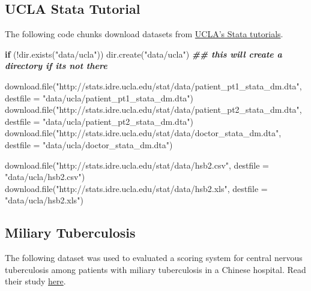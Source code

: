 \documentclass[
]{book}
\newenvironment{Shaded}{\begin{snugshade}}{\end{snugshade}}
\newcommand{\AttributeTok}[1]{\textcolor[rgb]{0.77,0.63,0.00}{#1}}
\newcommand{\ControlFlowTok}[1]{\textcolor[rgb]{0.13,0.29,0.53}{\textbf{#1}}}
\newcommand{\DocumentationTok}[1]{\textcolor[rgb]{0.56,0.35,0.01}{\textbf{\textit{#1}}}}
\newcommand{\FunctionTok}[1]{\textcolor[rgb]{0.00,0.00,0.00}{#1}}
\newcommand{\NormalTok}[1]{#1}
\newcommand{\SpecialCharTok}[1]{\textcolor[rgb]{0.00,0.00,0.00}{#1}}
\newcommand{\StringTok}[1]{\textcolor[rgb]{0.31,0.60,0.02}{#1}}
\begin{document}
\hypertarget{ucla-stata-tutorial}{%
\subsection{UCLA Stata Tutorial}\label{ucla-stata-tutorial}}

The following code chunks download datasets from \href{}{UCLA's Stata tutorials}.

\begin{Shaded}
\begin{Highlighting}[]
\ControlFlowTok{if}\NormalTok{ (}\SpecialCharTok{!}\FunctionTok{dir.exists}\NormalTok{(}\StringTok{"data/ucla"}\NormalTok{)) }
    \FunctionTok{dir.create}\NormalTok{(}\StringTok{"data/ucla"}\NormalTok{) }\DocumentationTok{\#\# this will create a directory if it\textquotesingle{}s not there}

\FunctionTok{download.file}\NormalTok{(}\StringTok{"http://stats.idre.ucla.edu/stat/data/patient\_pt1\_stata\_dm.dta"}\NormalTok{, }
              \AttributeTok{destfile =} \StringTok{"data/ucla/patient\_pt1\_stata\_dm.dta"}\NormalTok{)}
\FunctionTok{download.file}\NormalTok{(}\StringTok{"http://stats.idre.ucla.edu/stat/data/patient\_pt2\_stata\_dm.dta"}\NormalTok{, }
              \AttributeTok{destfile =} \StringTok{"data/ucla/patient\_pt2\_stata\_dm.dta"}\NormalTok{)}
\FunctionTok{download.file}\NormalTok{(}\StringTok{"http://stats.idre.ucla.edu/stat/data/doctor\_stata\_dm.dta"}\NormalTok{, }
              \AttributeTok{destfile =} \StringTok{"data/ucla/doctor\_stata\_dm.dta"}\NormalTok{)}

\FunctionTok{download.file}\NormalTok{(}\StringTok{"http://stats.idre.ucla.edu/stat/data/hsb2.csv"}\NormalTok{, }
              \AttributeTok{destfile =} \StringTok{"data/ucla/hsb2.csv"}\NormalTok{)}
\FunctionTok{download.file}\NormalTok{(}\StringTok{"http://stats.idre.ucla.edu/stat/data/hsb2.xls"}\NormalTok{, }
              \AttributeTok{destfile =} \StringTok{"data/ucla/hsb2.xls"}\NormalTok{)}
\end{Highlighting}
\end{Shaded}

\hypertarget{miliary-tuberculosis}{%
\subsection{Miliary Tuberculosis}\label{miliary-tuberculosis}}

The following dataset was used to evaluated a scoring system for central nervous tuberculosis among patients with miliary tuberculosis in a Chinese hospital. Read their study \href{https://journals.plos.org/plosone/article?id=10.1371/journal.pone.0176651}{here}.
\end{document}
